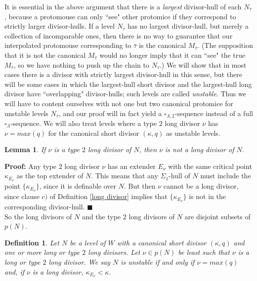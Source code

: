 \documentclass[12pt]{article}
\newtheorem{lem}[thm]{Lemma}
\newtheorem{defn}[thm]{Definition}
\begin{document}
It is essential in the above argument that there is a \textit{largest} divisor-hull of each $N_{\bar{\tau}}$, because a protomouse can only ``see" other protomice if they correspond to strictly larger divisor-hulls.  If a level $N_{\bar{\tau}}$ has no largest divisor-hull, but merely a collection of incomparable ones, then there is no way to guarantee that our interpolated protomouse corresponding to $\bar{\tau}$ is the canonical $M_{\bar{\tau}}$.  (The supposition that it is not the canonical $M_{\bar{\tau}}$ would no longer imply that it can ``see" the true $M_{\bar{\tau}}$, so we have nothing to push up the chain to $N_\tau$.)  We will show that in most cases there is a divisor with strictly largest divisor-hull in this sense, but there will be some cases in which the largest-hull short divisor and the largest-hull long divisor have ``overlapping" divisor-hulls; such levels are called \textit{unstable}.  Thus we will have to content ourselves with not one but two canonical protomice for unstable levels $N_\tau$, and our proof will in fact yield a $\square_{\Lambda , 2}$-sequence instead of a full $\square_\Lambda$-sequence.  We will also treat levels where a type $2$ long divisor $\nu$ has $\nu = max(q)$ for the canonical short divisor $(\kappa , q)$ as unstable levels.\\

\begin{lem}
If $\nu$ is a type $2$ long divisor of $N$, then $\nu$ is not a long divisor of $N$.
\end{lem}

\textbf{Proof:} Any type $2$ long divisor $\nu$ has an extender $E_\nu$ with the same critical point $\kappa_{E_\nu}$ as the top extender of $N$.  This means that any $\Sigma_1$-hull of $N$ must include the point $\{ \kappa_{E_\nu} \}$, since it is definable over $N$.  But then $\nu$ cannot be a long divisor, since clause $c)$ of Definition \ref{long divisor} implies that $\{ \kappa_{E_\nu} \}$ is not in the corresponding divisor-hull. $\blacksquare$\\

So the long divisors of $N$ and the type $2$ long divisors of $N$ are disjoint subsets of $p(N)$.\\

\begin{defn} \label{unstable level}
Let $N$ be a level of $W$ with a canonical short divisor $(\kappa , q)$ and one or more long or type $2$ long divisors.  Let $\nu \in p(N)$ be least such that $\nu$ is a long or type $2$ long divisor.  We say $N$ is unstable if and only if $\nu = max (q)$ and, if $\nu$ is a long divisor, $\kappa_{E_\nu} < \kappa$.
\end{defn}
\end{document}

